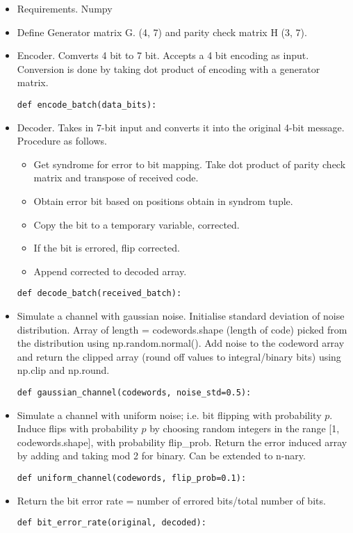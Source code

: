 \documentclass{scrartcl}
\begin{document}
\begin{itemize}
\item Requirements. Numpy
\item Define Generator matrix G. (4, 7) and parity check matrix H (3, 7).
\item Encoder. Comverts 4 bit to 7 bit. Accepts a 4 bit encoding as input. Conversion is done by taking dot product of encoding with a generator matrix.

\begin{verbatim}
def encode_batch(data_bits):
\end{verbatim}

\item Decoder. Takes in 7-bit input and converts it into the original 4-bit message. Procedure as follows.
    \begin{itemize}
        \item Get syndrome for error to bit mapping. Take dot product of parity check matrix and transpose of received code.
        \item Obtain error bit based on positions obtain in syndrom tuple.
        \item Copy the bit to a temporary variable, corrected.
        \item If the bit is errored, flip corrected.
        \item Append corrected to decoded array.
\end{itemize}  
\begin{verbatim}
def decode_batch(received_batch):
\end{verbatim}

\item Simulate a channel with gaussian noise. Initialise standard deviation of noise distribution. Array of length = codewords.shape (length of code) picked from the distribution using np.random.normal(). Add noise to the codeword array and return the clipped array (round off values to integral/binary bits) using np.clip and np.round.
\begin{verbatim}
def gaussian_channel(codewords, noise_std=0.5):
\end{verbatim}

\item Simulate a channel with uniform noise; i.e. bit flipping with probability $p.$ Induce flips with probability $p$ by choosing random integers in the range [1, codewords.shape], with probability flip\_prob. Return the error induced array by adding and taking mod 2 for binary. Can be extended to n-nary.
\begin{verbatim}
def uniform_channel(codewords, flip_prob=0.1):
\end{verbatim}

\item Return the bit error rate = number of errored bits/total number of bits.
\begin{verbatim}
def bit_error_rate(original, decoded):
\end{verbatim}

\end{itemize}
\end{document}
